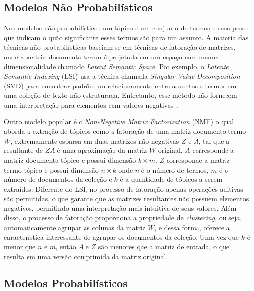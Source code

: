 \subsection{Modelos Não Probabilísticos}

Nos modelos não-probabilísticos um tópico é um conjunto de termos e seus pesos que indicam o quão significante esses termos são para um assunto. A maioria das técnicas não-probabilísticas baseiam-se em técnicas de fatoração de matrizes, onde a matrix documento-termo é projetada em um espaço com menor dimensionalidade chamado \textit{Latent Semantic Space}. Por exemplo, o \textit{Latente Semantic Indexing} (LSI) usa a técnica chamada \textit{Singular Value Decomposition} (SVD) para encontrar padrões no relacionamento entre assuntos e termos em uma coleção de texto não estruturada. Entretanto, esse método não fornecem uma interpretação para elementos com valores negativos~\cite{Cheng2013}. %

Outro modelo popular é o \textit{Non-Negative Matrix Factorization} (NMF) o qual aborda a extração de tópicos como a fatoração de uma matriz documento-termo $W$, extremamente esparsa em duas matrizes não negativas $Z$ e $A$, tal que a resultante de $ZA$ é uma aproximação da matriz $W$ original.  $A$ corresponde a matriz documento-tópico e possui dimensão $k \times m$. $Z$ corresponde a matriz termo-tópico e possui dimensão $n \times k$ onde $n$ é o número de termos, $m$ é o número de documentos da coleção e $k$ é a quantidade de tópicos a serem extraídos.  Diferente do LSI, no processo de fatoração apenas operações aditivas são permitidas, o que garante que as matrizes resultantes não possuem elementos negativos, permitindo uma interpretação mais intuitiva de seus valores. Além disso, o processo de fatoração proporciona a propriedade de \textit{clustering}, ou seja, automaticamente agrupar as colunas da matriz $W$, e dessa forma, oferece a característica interessante de agrupar os documentos da coleção. Uma vez que $k$ é menor que $n$ e $m$, então $A$ e $Z$ são menores que a matriz de entrada, o que resulta em uma versão comprimida da matriz original.





\subsection{Modelos Probabilísticos}

